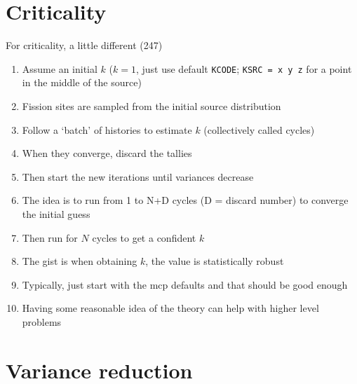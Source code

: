 \documentclass[aspectratio=1610,pdftex,dvipsnames,compress,xcolor={dvipsnames}]{beamer}
\newcommand{\acs}{\acrshort} %
\begin{document}
\section{Criticality}


\addtocounter{framenumber}{-1} 
\begin{frame}{For criticality, a little different (247)}
    \begin{enumerate}[series=outerlist,topsep=0pt,itemsep=5pt,leftmargin=*,label=(\arabic*)]
        \item[]Assume an initial $k$ ($k = 1$, just use default \texttt{KCODE}; \texttt{KSRC = x y z} for a point in the middle of the source)  
        \item[]Fission sites are sampled from the initial source distribution
        \item[]Follow a `batch' of histories to estimate $k$ (collectively called cycles)
        \item[]When they converge, discard the tallies
        \item[]Then start the new iterations until variances decrease
        \item[]The idea is to run from 1 to N+D cycles (D = discard number) to converge the initial guess
        \item[]Then run for $N$ cycles to get a confident $k$
        \item[]The gist is when obtaining $k$, the value is statistically robust
        \item[]Typically, just start with the \acs{mcp} defaults and that should be good enough
        \item[]Having some reasonable idea of the theory can help with higher level problems
    \end{enumerate}
\end{frame}


\section{Variance reduction}
\end{document}
